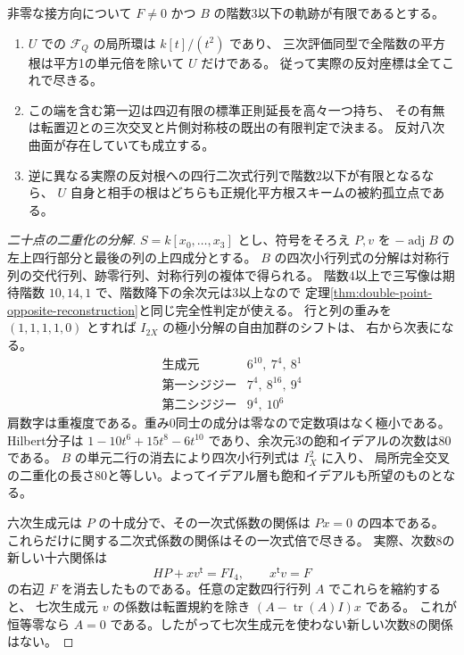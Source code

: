 \begin{theorem}\label{thm:tangent-determinantal-octics}
非零な接方向について $F\ne0$ かつ $B$ の階数3以下の軌跡が有限であるとする。
\begin{enumerate}
\item $U$ での $\mathcal F_Q$ の局所環は $k[t]/(t^2)$ であり、
三次評価同型で全階数の平方根は平方1の単元倍を除いて $U$ だけである。
従って実際の反対座標は全てこれで尽きる。
\item この端を含む第一辺は四辺有限の標準正則延長を高々一つ持ち、
その有無は転置辺との三次交叉と片側対称枝の既出の有限判定で決まる。
反対八次曲面が存在していても成立する。
\item 逆に異なる実際の反対根への四行二次式行列で階数2以下が有限となるなら、
$U$ 自身と相手の根はどちらも正規化平方根スキームの被約孤立点である。
\end{enumerate}
\end{theorem}
\begin{proof}[二十点の二重化の分解]
$S=k[x_0,\ldots,x_3]$ とし、符号をそろえ $P,v$ を $-\operatorname{adj}B$ の
左上四行部分と最後の列の上四成分とする。
$B$ の四次小行列式の分解は対称行列の交代行列、跡零行列、対称行列の複体で得られる。
階数4以上で三写像は期待階数 $10,14,1$ で、階数降下の余次元は3以上なので
定理\ref{thm:double-point-opposite-reconstruction}と同じ完全性判定が使える。
行と列の重みを $(1,1,1,1,0)$ とすれば $I_{2X}$ の極小分解の自由加群のシフトは、
右から次表になる。
\[
\begin{array}{c|c}
\text{生成元}&6^{10},\ 7^4,\ 8^1\\
\text{第一シジジー}&7^4,\ 8^{16},\ 9^4\\
\text{第二シジジー}&9^4,\ 10^6
\end{array}
\]
肩数字は重複度である。重み0同士の成分は零なので定数項はなく極小である。
Hilbert分子は $1-10t^6+15t^8-6t^{10}$ であり、余次元3の飽和イデアルの次数は80である。
$B$ の単元二行の消去により四次小行列式は $I_X^2$ に入り、
局所完全交叉の二重化の長さ80と等しい。よってイデアル層も飽和イデアルも所望のものとなる。

六次生成元は $P$ の十成分で、その一次式係数の関係は $Px=0$ の四本である。
これらだけに関する二次式係数の関係はその一次式倍で尽きる。
実際、次数8の新しい十六関係は
\[
                 HP+xv^{\mathsf t}=F I_4,\qquad x^{\mathsf t}v=F
\]
の右辺 $F$ を消去したものである。任意の定数四行行列 $A$ でこれらを縮約すると、
七次生成元 $v$ の係数は転置規約を除き $(A-\operatorname{tr}(A) I)x$ である。
これが恒等零なら $A=0$ である。したがって七次生成元を使わない新しい次数8の関係はない。
\end{proof}

